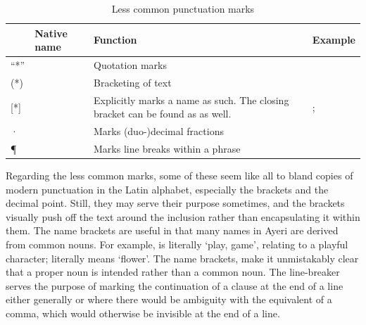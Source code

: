 \begin{table}[tp]
\caption{Less common punctuation marks}
\begin{tabu} to 
\toprule
\tableheaderfont

	& Native name
	& Function
	& Example
	\\
	
\toprule

“*”
	& 
	& Quotation marks
	& 
	\\
	
\midrule

(*)
	& 
	& Bracketing of text
	& 
	\\

\midrule

[*]
	& 
	& Explicitly marks a name as such. The closing bracket can be found as
		 as well.
	& ; 
	\\
	
\midrule

·
	& 
	& Marks (duo-)decimal fractions
	& 
	\\
	
\midrule

¶
	& 
	& Marks line breaks within a phrase
	& 
	\\

\bottomrule
\end{tabu}
\label{tab:thpunctuncom}
\end{table}

Regarding the less common marks, some of these seem like all to bland copies of
modern punctuation in the Latin alphabet, especially the brackets and the
decimal point. Still, they may serve their purpose sometimes, and the brackets
\ayr{(*)} visually push off the text around the inclusion rather than
encapsulating it within them. The name brackets \ayr{[*]} are useful in that
many names in Ayeri are derived from common nouns. For example,
 is literally `play, game', relating to a playful
character;  literally means `flower'. The name brackets,
make it unmistakably clear that a proper noun is intended rather than a common
noun. The line-breaker  serves the purpose of marking the continuation
of a clause at the end of a line either generally or where there would be
ambiguity with the equivalent of a comma, which would otherwise be invisible at
the end of a line.

